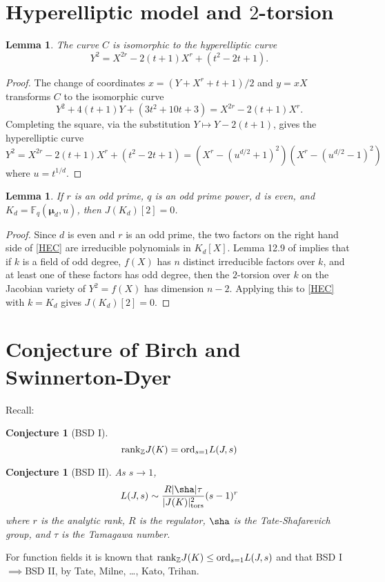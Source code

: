 \documentclass[reqno]{amsart}
\newtheorem{conj}[thm]{Conjecture}
\newtheorem{lem}[thm]{Lemma}
\theoremstyle{definition}
\theoremstyle{remark}
\def\bmu{{\boldsymbol\mu}}
\def\ord{\textrm{\upshape ord}}
\def\Z{\mathbb{Z}}
\def\F{\mathbb{F}}
\def\rank{\textnormal{rank}}
\def\tors{\textnormal{tors}}
\begin{document}
\section{Hyperelliptic model and $2$-torsion}


\begin{lem}
The curve $C$ is isomorphic to the hyperelliptic curve
$$
Y^2=X^{2r}-2(t+1)X^r+(t^2-2t+1).
$$
\end{lem}

\begin{proof}
The change of coordinates
$x=(Y+X^r+t+1)/2$ and $y=xX$ transforms
$C$ to the isomorphic curve  
$$Y^2 + 4(t+1)Y + (3t^2+10t+3)=X^{2r}-2(t+1)X^r.$$
Completing the square, via the substitution $Y \mapsto Y - 2(t+1)$, gives 
the hyperelliptic curve
\begin{equation}
\label{HEC}
Y^2=X^{2r}-2(t+1)X^r+(t^2-2t+1) = (X^r-(u^{d/2}+1)^2)(X^r-(u^{d/2}-1)^2)
\end{equation}
where $u=t^{1/d}$.
\end{proof}



\begin{lem}
If $r$ is an odd prime, $q$ is an odd prime power, $d$ is even, and $K_d=\F_q(\bmu_d,u)$,
then $J(K_d)[2]=0$.
\end{lem}

\begin{proof}
Since $d$ is even and $r$ is an odd prime, the two factors on the right hand side of
\eqref{HEC} are irreducible polynomials in $K_d[X]$.
Lemma 12.9 of \cite{ps} implies that if $k$ is a field of odd degree,
$f(X)$ has $n$ distinct irreducible factors over $k$, and at least one 
of these factors has odd degree,
then the $2$-torsion over $k$ on the Jacobian variety of $Y^2=f(X)$ has 
dimension $n-2$. 
Applying this to \eqref{HEC} with $k=K_d$ gives
$J(K_d)[2]=0$.
\end{proof}


\section{Conjecture of Birch and Swinnerton-Dyer}

Recall:

\begin{conj}[BSD I]
$$\rank_\Z J(K) = \ord_{s=1}L(J,s)$$
\end{conj}

\begin{conj}[BSD II]
As $s \to 1$,
$$
L(J,s) \sim \frac{R|\sha|\tau}{|J(K)|^2_{\tors}}(s-1)^r
$$
where $r$ is the analytic rank,
$R$ is the regulator, $\sha$ is the Tate-Shafarevich group, and
$\tau$ is the Tamagawa number.
\end{conj}
For function fields it is known that $\rank_\Z J(K) \le \ord_{s=1}L(J,s)$
and that BSD I$\implies$BSD II, by Tate, Milne, \ldots, Kato, Trihan.
\end{document}
